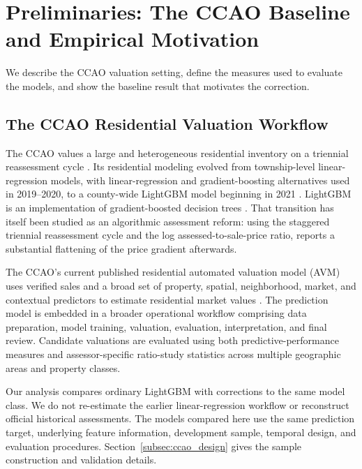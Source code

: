 \documentclass[10pt]{article}
\theoremstyle{definition}
\newcommand{\1}{\mathbf{1}}
\begin{document}
\section{Preliminaries: The CCAO Baseline and Empirical Motivation}
\label{sec:setting}


We describe the CCAO valuation setting, define the measures used to evaluate the models, and show the baseline result that motivates the correction.


\subsection{The CCAO Residential Valuation Workflow}
\label{subsec:ccao_workflow}

The CCAO values a large and heterogeneous residential inventory on a triennial reassessment cycle \cite{CCAOAssessmentCalendar2026}. Its residential modeling evolved from township-level linear-regression models, with linear-regression and gradient-boosting alternatives used in 2019--2020, to a county-wide LightGBM model beginning in 2021 \cite{CCAOModelResAVM2026}. LightGBM is an implementation of gradient-boosted decision trees \cite{lightgbm}. That transition has itself been studied as an algorithmic assessment reform: using the staggered triennial reassessment cycle and the log assessed-to-sale-price ratio, \textcite{Liu2026} reports a substantial flattening of the price gradient afterwards.

The CCAO's current published residential automated valuation model (AVM) uses verified sales and a broad set of property, spatial, neighborhood, market, and contextual predictors to estimate residential market values \cite{CCAOModelResAVM2026}. The prediction model is embedded in a broader operational workflow comprising data preparation, model training, valuation, evaluation, interpretation, and final review. Candidate valuations are evaluated using both predictive-performance measures and assessor-specific ratio-study statistics across multiple geographic areas and property classes.


Our analysis compares ordinary LightGBM with corrections to the same model class. We do not re-estimate the earlier linear-regression workflow or reconstruct official historical assessments. The models compared here use the same prediction target, underlying feature information, development sample, temporal design, and evaluation procedures. Section~\ref{subsec:ccao_design} gives the sample construction and validation details.
\end{document}
